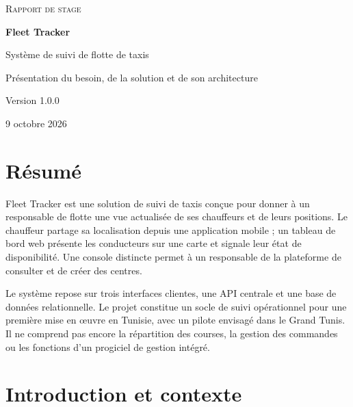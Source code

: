 \documentclass[11pt,a4paper,oneside]{report}
\begin{document}
\begin{titlepage}
  \centering
  \vspace*{2.2cm}
  {\Large\scshape Rapport de stage\par}
  \vspace{0.7cm}
  {\Huge\bfseries\color{fleetgreen} Fleet Tracker\par}
  \vspace{0.5cm}
  {\Large Système de suivi de flotte de taxis\par}
  \vspace{1.3cm}
  {\large Présentation du besoin, de la solution et de son architecture\par}
  \vfill
  \vfill
  {\large Version 1.0.0\par}
  \vspace{0.25cm}
  {\large 9 octobre 2026\par}
  \vspace*{1.4cm}
\end{titlepage}

\tableofcontents
\clearpage
{}

\chapter*{Résumé}

Fleet Tracker est une solution de suivi de taxis conçue pour donner à un
responsable de flotte une vue actualisée de ses chauffeurs et de leurs
positions. Le chauffeur partage sa localisation depuis une application mobile ;
un tableau de bord web présente les conducteurs sur une carte et signale leur
état de disponibilité. Une console distincte permet à un responsable de la
plateforme de consulter et de créer des centres.

Le système repose sur trois interfaces clientes, une API centrale et une base
de données relationnelle. Le projet constitue un socle de suivi opérationnel
pour une première mise en œuvre en Tunisie, avec un pilote envisagé dans le
Grand Tunis. Il ne comprend pas encore la répartition des courses, la gestion
des commandes ou les fonctions d'un progiciel de gestion intégré.

\chapter{Introduction et contexte}
\end{document}
